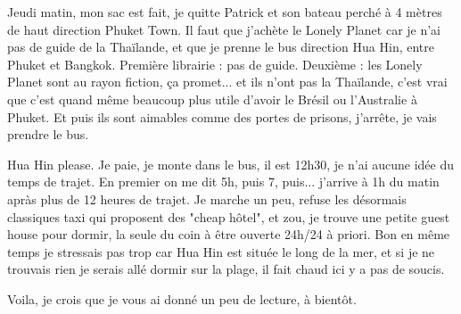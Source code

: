 \begin{multicols}{2}
Jeudi matin, mon sac est fait, je quitte Patrick et son bateau perché à 4 mètres de haut direction Phuket Town. Il faut que j'achète le Lonely Planet car je n'ai pas de guide de la Thaïlande, et que je prenne le bus direction Hua Hin, entre Phuket et Bangkok. Première librairie : pas de guide. Deuxième : les Lonely Planet sont au rayon fiction, ça promet... et ils n'ont pas la Thaïlande, c'est vrai que c'est quand même beaucoup plus utile d'avoir le Brésil ou l'Australie à Phuket. Et puis ils sont aimables comme des portes de prisons, j'arrête, je vais prendre le bus.

Hua Hin please. Je paie, je monte dans le bus, il est 12h30, je n'ai aucune idée du temps de trajet. En premier on me dit 5h, puis 7, puis... j'arrive à 1h du matin apràs plus de 12 heures de trajet. Je marche un peu, refuse les désormais classiques taxi qui proposent des "cheap hôtel", et zou, je trouve une petite guest house pour dormir, la seule du coin à être ouverte 24h/24 à priori. Bon en même temps je stressais pas trop car Hua Hin est située le long de la mer, et si je ne trouvais rien je serais allé dormir sur la plage, il fait chaud ici y a pas de soucis.

Voila, je crois que je vous ai donné un peu de lecture, à bientôt.

\end{multicols}


